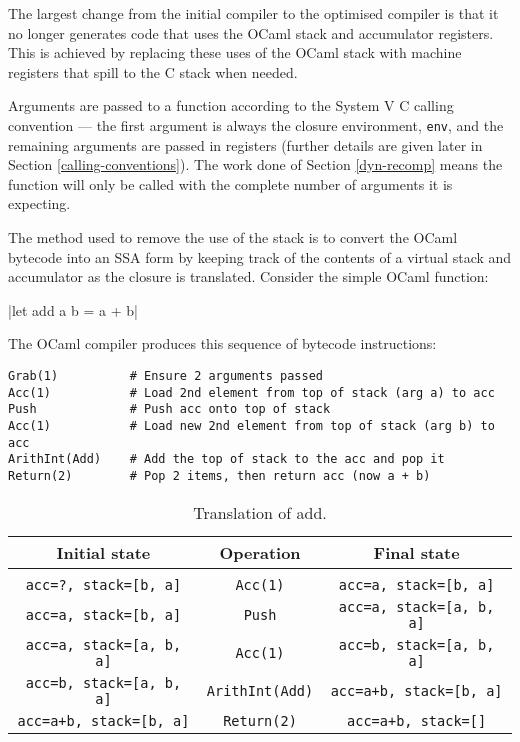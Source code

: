 The largest change from the initial compiler to the optimised compiler is that it no longer
generates
code that uses the OCaml stack and accumulator registers. This is achieved by replacing these uses
of the OCaml stack with machine registers that spill to the C stack when needed.

Arguments are passed to a function according to the System V C calling convention --- the first
argument is always the closure environment, \texttt{env}, and the remaining arguments are passed
in registers (further details are given later in Section \ref{calling-conventions}). The work done
of Section \ref{dyn-recomp} means the function will only be called with the complete number of
arguments it is expecting.

The method used to remove the use of the stack is to convert the OCaml bytecode into an SSA form
by keeping track of the contents of a virtual stack and accumulator as the closure is translated.
Consider the simple OCaml function:

|let add a b = a + b|

The OCaml compiler produces this sequence of bytecode instructions:

\begin{verbatim}
Grab(1)          # Ensure 2 arguments passed
Acc(1)           # Load 2nd element from top of stack (arg a) to acc
Push             # Push acc onto top of stack
Acc(1)           # Load new 2nd element from top of stack (arg b) to acc
ArithInt(Add)    # Add the top of stack to the acc and pop it
Return(2)        # Pop 2 items, then return acc (now a + b)
\end{verbatim}

\begin{table}[h]
      \centering
      \begin{tabular}{ccc}\toprule
            Initial state                   & Operation              & Final state
            \\
            \midrule
            \\
            \texttt{acc=?, stack=[b, a]}    & \texttt{Acc(1)}        & \texttt{acc=a, stack=[b, a]}
            \\
            \texttt{acc=a, stack=[b, a]}    & \texttt{Push}          & \texttt{acc=a, stack=[a, b,
                              a]}
            \\
            \texttt{acc=a, stack=[a, b, a]} & \texttt{Acc(1)}        & \texttt{acc=b, stack=[a, b,
                              a]}
            \\
            \texttt{acc=b, stack=[a, b, a]} & \texttt{ArithInt(Add)} & \texttt{acc=a+b, stack=[b,
                              a]}
            \\
            \texttt{acc=a+b, stack=[b, a]}  & \texttt{Return(2)}     & \texttt{acc=a+b, stack=[]}
            \\
            \bottomrule
      \end{tabular}

      \caption{Translation of add.}
      \label{table:stacktrans}
\end{table}

